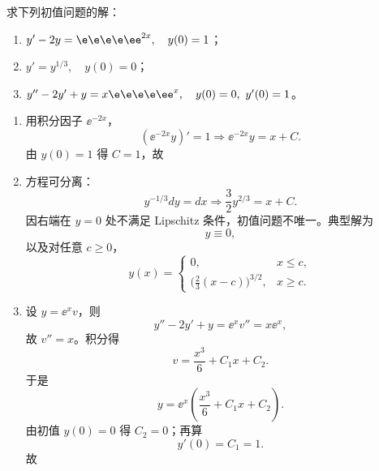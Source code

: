 ﻿


\begin{question}
求下列初值问题的解：
\begin{enumerate}[label=(\arabic*),leftmargin=2.8em,itemsep=0.2em]
\item $y'-2y=\e\e\e\e\ee^{2x},\quad y(0)=1$；
\item $y'=y^{1/3},\quad y(0)=0$；
\item $y''-2y'+y=x\e\e\e\e\ee^{x},\quad y(0)=0,\ y'(0)=1$。
\end{enumerate}
\begin{solution}

\begin{enumerate}[label=(\arabic*),leftmargin=2.8em,itemsep=0.2em]
\item 用积分因子 $\ee^{-2x}$，
\[
(\ee^{-2x}y)'=1\Longrightarrow \ee^{-2x}y=x+C.
\]
由 $y(0)=1$ 得 $C=1$，故
\item 方程可分离：
\[
 y^{-1/3}dy=dx\Longrightarrow \frac32 y^{2/3}=x+C.
\]
因右端在 $y=0$ 处不满足 Lipschitz 条件，初值问题不唯一。典型解为
\[
 y\equiv0,
\]
以及对任意 $c\ge0$，
\[
 y(x)=\begin{cases}
 0,&x\le c,\\
 \bigl(\frac23(x-c)\bigr)^{3/2},&x\ge c.
 \end{cases}
\]
\item 设 $y=\ee^{x}v$，则
\[
 y''-2y'+y=\ee^{x}v''=x\ee^{x},
\]
故 $v''=x$。积分得
\[
 v=\frac{x^3}{6}+C_1x+C_2.
\]
于是
\[
 y=\ee^{x}\left(\frac{x^3}{6}+C_1x+C_2\right).
\]
由初值 $y(0)=0$ 得 $C_2=0$；再算
\[
 y'(0)=C_1=1.
\]
故
\end{enumerate}
\end{solution}
\end{question}

